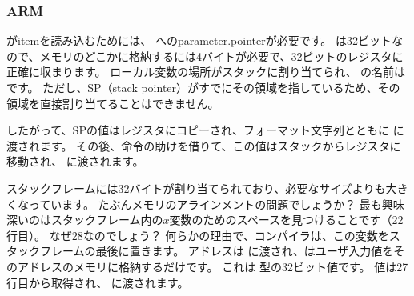 \subsubsection{ARM}

\myparagraph{\OptimizingKeilVI (\ThumbMode)}



\myindex{\CLanguageElements!\Pointers}

\scanf がitemを読み込むためには、 \Tint へのparameter.pointerが必要です。 
\Tint は32ビットなので、メモリのどこかに格納するには4バイトが必要で、32ビットのレジスタに正確に収まります。 
ローカル変数の場所がスタックに割り当てられ、 
\IDA の名前はです。 ただし、\ac{SP}（\gls{stack pointer}）がすでにその領域を指しているため、その領域を直接割り当てることはできません。 

したがって、\ac{SP}の値はレジスタにコピーされ、フォーマット文字列とともに \scanf に渡されます。 
その後、命令の助けを借りて、この値はスタックからレジスタに移動され、 \printf に渡されます。




スタックフレームには32バイトが割り当てられており、必要なサイズよりも大きくなっています。 たぶんメモリのアラインメントの問題でしょうか？ 
最も興味深いのはスタックフレーム内の$x$変数のためのスペースを見つけることです（22行目）。 
なぜ28なのでしょう？ 何らかの理由で、コンパイラは、この変数をスタックフレームの最後に置きます。 
アドレスは \scanf に渡され、\scanf はユーザ入力値をそのアドレスのメモリに格納するだけです。 
これは \Tint 型の32ビット値です。 
値は27行目から取得され、 \printf に渡されます。
